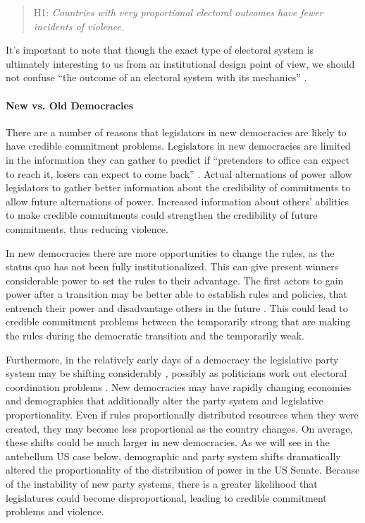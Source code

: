 \documentclass[a4paper]{article}\usepackage[]{graphicx}\usepackage[]{color}
\begin{document}
\begin{quote}
    H1: \emph{Countries with very proportional electoral outcomes have fewer incidents of violence.}
\end{quote}

It's important to note that though the exact type of electoral system is ultimately interesting to us from an institutional design point of view, we should not confuse ``the outcome of an electoral system with its mechanics'' \citep[][109]{Golder2005}.

\paragraph{New vs. Old Democracies}

There are a number of reasons that legislators in new democracies are likely to have credible commitment problems. Legislators in new democracies are limited in the information they can gather to predict if ``pretenders to office can expect to reach it, losers can expect to come back'' \citep[][36]{Przeworski1991}. Actual alternations of power allow legislators to gather better information about the credibility of commitments to allow future alternations of power. Increased information about others' abilities to make credible commitments could strengthen the credibility of future commitments, thus reducing violence.

In new democracies there are more opportunities to change the rules, as the status quo has not been fully institutionalized. This can give present winners considerable power to set the rules to their advantage. The first actors to gain power after a transition may be better able to establish rules and policies, that entrench their power and disadvantage others in the future \cite[108]{Saideman2002}. This could lead to credible commitment problems between the temporarily strong that are making the rules during the democratic transition and the temporarily weak.

Furthermore, in the relatively early days of a democracy the legislative party system may be shifting considerably \cite[161]{Mainwaring2007b}, possibly as politicians work out electoral coordination problems \citep{cox1997}. New democracies may have rapidly changing economies and demographics that additionally alter the party system and legislative proportionality. Even if rules proportionally distributed resources when they were created, they may become less proportional as the country changes. On average, these shifts could be much larger in new democracies. As we will see in the antebellum US case below, demographic and party system shifts dramatically altered the proportionality of the distribution of power in the US Senate. Because of the instability of new party systems, there is a greater likelihood that legislatures could become disproportional, leading to credible commitment problems and violence.
\end{document}
